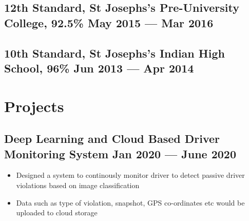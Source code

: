 \documentclass[a4,10pt]{article}
\newenvironment{zitemize}{
\begin{itemize}\itemsep0pt \parskip0pt \parsep1pt}
{\end{itemize}\vspace{-0.5cm}}
\begin{document}
\subsection*{12th Standard, {\normalsize \normalfont St Josephs's Pre-University College, 92.5\%} \hfill May 2015 --- Mar 2016}
\vspace{0.1cm}
\subsection*{10th Standard, {\normalsize \normalfont St Josephs's Indian High School, 96\%} \hfill Jun 2013 --- Apr 2014} 
\vspace{0.2cm}





\section{Projects} %



\subsection*{Deep Learning and Cloud Based Driver Monitoring System \hfill Jan 2020 --- June 2020} 
    \begin{zitemize}
        \item Designed a system to continously monitor driver to detect passive driver violations based on image classification 
        \item Data such as type of violation, snapshot, GPS co-ordinates etc would be uploaded to cloud storage
    \end{zitemize}
\end{document}
